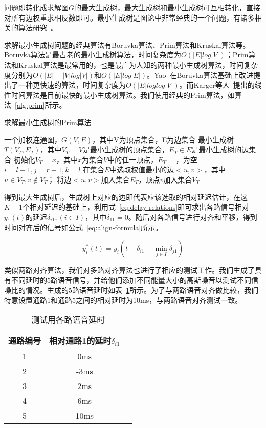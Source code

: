 问题即转化成求解图$G$的最大生成树，最大生成树和最小生成树可互相转化，直接对所有边权重求相反数即可。最小生成树是图论中非常经典的一个问题，有诸多相关的算法研究~\cite{bazlamaccci2001minimum}。

求解最小生成树问题的经典算法有Boruvka算法、Prim算法和Kruskal算法等。Boruvka算法是最古老的最小生成树算法，时间复杂度为$O(|E|log|V|)$；Prim算法和Kruskal算法是最常用的，也是最广为人知的两种最小生成树算法，时间复杂度分别为$O(|E|+|V|log|V|)$和$O(|E|log|E|)$。Yao~\cite{yao19750}在Boruvka算法基础上改进提出了一种更快速的算法，时间复杂度为$O(|E|loglog|V|)$。而Karger等人~\cite{karger1995randomized}提出的线性时间算法是目前最快的最小生成树算法。我们使用经典的Prim算法，如算法~\ref{alg:prim}所示。

\begin{algorithm}
    \caption{求解最小生成树的Prim算法}
    \label{alg:prim}
\begin{algorithmic}[1]
\INPUT
    \Statex 一个加权连通图，$G(V, E)$，其中V为顶点集合，E为边集合
\OUTPUT
    \Statex 最小生成树$T(V_T, E_T)$，其中$V_T = V$是最小生成树的顶点集合，$E_T \in E$是最小生成树的边集合
\State 初始化$V_T = {x}$，其中$x$为集合$V$中的任一顶点，$E_T = {}$，为空
\State $i=l-1, j=r+1, k=l$
    \State 在集合$E$中选取权值最小的边$<u, v>$，其中$u \in V_T, v \not\in V_T$；
    \State 将边$<u, v>$加入集合$E_T$，顶点$v$加入集合$V_T$
\EndWhile
\end{algorithmic}
\end{algorithm}

得到最大生成树后，生成树上对应的边即代表应该选取的相对延迟估计，在这$K-1$个相对延迟的基础上，利用式~\ref{eq:delay-relations}即可求出各路信号相对$y_1 (t)$的延迟$\delta_{i1},(i \in I)$，其中$\delta_{11}=0$。随后对各路信号进行对齐和平移，得到时间对齐后的信号如公式~\ref{eq:align-formula}所示。

\begin{equation}\label{eq:align-formula}
y_i^* (t)=y_i (t+\delta_{i1}-\min_{j\in I}\delta_{j1})
\end{equation}

类似两路对齐算法，我们对多路对齐算法也进行了相应的测试工作。我们生成了具有不同延时的5路语音信号，并给他们添加不同能量大小的高斯噪音以测试不同信噪比的情况。生成的5路语音延时如表~\ref{tab:delays}所示。为了与两路语音对齐做比较，我们特意设置通路1和通路5之间的相对延时为10ms，与两路语音对齐测试一致。

\begin{table}
\centering
\caption{测试用各路语音延时}
\label{tab:delays}
\begin{tabular}{ccc}
\toprule[1.5pt]
通路编号 & 相对通路1的延时$\delta_{i1}$ \\ \midrule[1pt]
1 & 0ms \\
2 & -3ms \\
3 & 2ms \\
4 & 6ms \\
5 & 10ms \\ \bottomrule[1.5pt]
\end{tabular}
\end{table}

